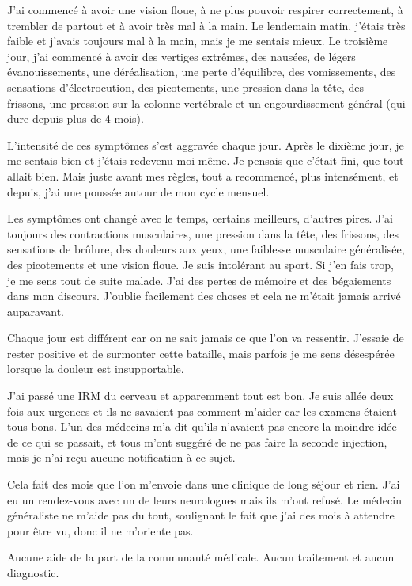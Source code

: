 J'ai commencé à avoir une vision floue, à ne plus pouvoir respirer correctement,
à trembler de partout et à avoir très mal à la main. Le lendemain matin, j'étais
très faible et j'avais toujours mal à la main, mais je me sentais mieux. Le
troisième jour, j'ai commencé à avoir des vertiges extrêmes, des nausées, de
légers évanouissements, une déréalisation, une perte d'équilibre, des
vomissements, des sensations d'électrocution, des picotements, une pression dans
la tête, des frissons, une pression sur la colonne vertébrale et un
engourdissement général (qui dure depuis plus de 4 mois).

L'intensité de ces symptômes s'est aggravée chaque jour. Après le dixième jour,
je me sentais bien et j'étais redevenu moi-même. Je pensais que c'était fini,
que tout allait bien. Mais juste avant mes règles, tout a recommencé, plus
intensément, et depuis, j'ai une poussée autour de mon cycle mensuel.

Les symptômes ont changé avec le temps, certains meilleurs, d'autres pires. J'ai
toujours des contractions musculaires, une pression dans la tête, des frissons,
des sensations de brûlure, des douleurs aux yeux, une faiblesse musculaire
généralisée, des picotements et une vision floue. Je suis intolérant au
sport. Si j'en fais trop, je me sens tout de suite malade. J'ai des pertes de
mémoire et des bégaiements dans mon discours. J'oublie facilement des choses et
cela ne m'était jamais arrivé auparavant.

Chaque jour est différent car on ne sait jamais ce que l'on va
ressentir. J'essaie de rester positive et de surmonter cette bataille, mais
parfois je me sens désespérée lorsque la douleur est insupportable.

J'ai passé une IRM du cerveau et apparemment tout est bon. Je suis allée deux
fois aux urgences et ils ne savaient pas comment m'aider car les examens étaient
tous bons. L'un des médecins m'a dit qu'ils n'avaient pas encore la moindre idée
de ce qui se passait, et tous m'ont suggéré de ne pas faire la seconde
injection, mais je n'ai reçu aucune notification à ce sujet.

Cela fait des mois que l'on m'envoie dans une clinique de long séjour et
rien. J'ai eu un rendez-vous avec un de leurs neurologues mais ils m'ont
refusé. Le médecin généraliste ne m'aide pas du tout, soulignant le fait que
j'ai des mois à attendre pour être vu, donc il ne m'oriente pas.

Aucune aide de la part de la communauté médicale. Aucun traitement et aucun
diagnostic.

